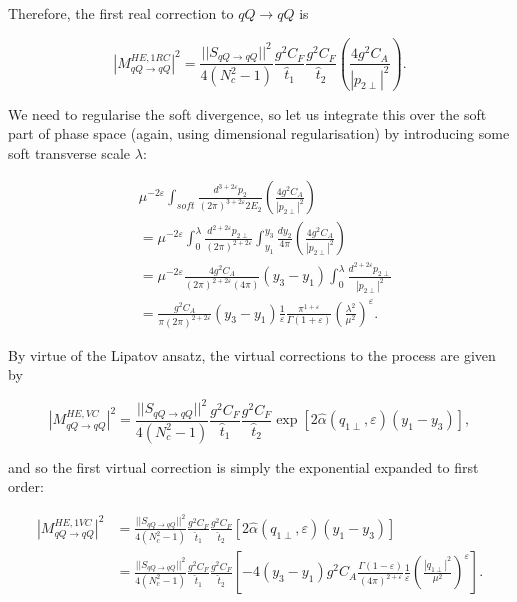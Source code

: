 
Therefore, the first real correction to $qQ \to qQ$ is

\begin{equation}
|M_{qQ \to qQ}^{HE, 1RC}|^2 = \frac{||S_{qQ \to qQ}||^2}{4 (N_c^2 - 1)}\frac{g^2 C_{F}}{\hat{t}_1} \frac{g^2 C_{F}}{\hat{t}_2} \left(\frac{4g^2 C_A}{|p_{2 \perp}|^2} \right).
\end{equation}

We need to regularise the soft divergence, so let us integrate this over the soft part of phase space (again, using dimensional regularisation) by introducing some soft transverse scale $\lambda$:

\begin{equation}
\begin{split}
& \mu^{-2 \varepsilon} \int_{soft} \frac{d^{3 + 2 \varepsilon}p_2}{(2 \pi)^{3 + 2 \varepsilon} 2E_2} \left(\frac{4g^2 C_A}{|p_{2 \perp}|^2} \right) \\
& = \mu^{-2 \varepsilon} \int_0^\lambda \frac{d^{2 + 2 \varepsilon}p_{2 \perp}}{(2 \pi)^{2 + 2 \varepsilon}} \int_{y_1}^{y_3} \frac{d y_2}{4 \pi} \left(\frac{4g^2 C_A}{|p_{2 \perp}|^2} \right) \\
&= \mu^{-2 \varepsilon} \frac{4 g^2 C_A}{(2 \pi)^{2 + 2\varepsilon}(4 \pi)} (y_3 - y_1) \int_0^\lambda \frac{d^{2 + 2 \varepsilon}p_{2\perp}}{|p_{2 \perp}|^2} \\
&= \frac{g^2 C_A}{\pi (2 \pi)^{2 + 2 \varepsilon}} (y_3 - y_1) \frac{1}{\varepsilon} \frac{\pi^{1 + \varepsilon}}{\Gamma(1 + \varepsilon)} \left( \frac{\lambda^2}{\mu^2}\right)^\varepsilon.
\end{split}
\end{equation}

By virtue of the Lipatov ansatz, the virtual corrections to the process are given by

\begin{equation}
|M_{qQ \to qQ}^{HE, VC}|^2 = \frac{||S_{qQ \to qQ}||^2}{4 (N_c^2 - 1)}\frac{g^2 C_{F}}{\hat{t}_1} \frac{g^2 C_{F}}{\hat{t}_2} \exp \left[2 \hat{\alpha}(q_{1 \perp}, \varepsilon)(y_1 - y_3) \right],
\end{equation}

and so the first virtual correction is simply the exponential expanded to first order:

\begin{equation}
\begin{split}
|M_{qQ \to qQ}^{HE, 1VC}|^2 &= \frac{||S_{qQ \to qQ}||^2}{4 (N_c^2 - 1)}\frac{g^2 C_{F}}{\hat{t}_1} \frac{g^2 C_{F}}{\hat{t}_2} \left[2 \hat{\alpha}(q_{1 \perp}, \varepsilon)(y_1 - y_3) \right] \\
& = \frac{||S_{qQ \to qQ}||^2}{4 (N_c^2 - 1)}\frac{g^2 C_{F}}{\hat{t}_1} \frac{g^2 C_{F}}{\hat{t}_2} \left[- 4 (y_3 - y_1) g^2 C_A \frac{\Gamma(1 - \varepsilon)}{(4 \pi)^{2 + \varepsilon}} \frac{1}{\varepsilon}  \left( \frac{|q_{1 \perp}|^2}{\mu^2}\right)^\varepsilon \right].
\end{split}
\end{equation}


